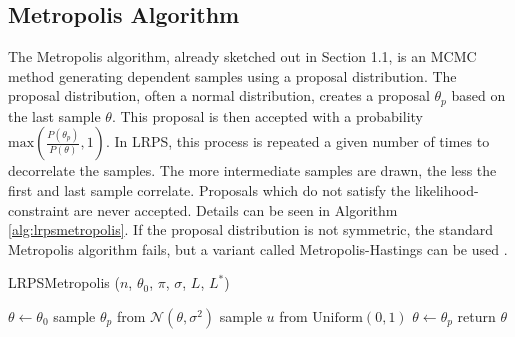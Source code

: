 \documentclass[12pt, a4paper]{report}
\begin{document}
\subsection{Metropolis Algorithm}
The Metropolis algorithm, already sketched out in Section 1.1, is an MCMC method generating dependent samples using a proposal distribution.
The proposal distribution, often a normal distribution, creates a proposal $\theta_p$ based on the last sample $\theta$.
This proposal is then accepted with a probability $\textrm{max}\left(\frac{P(\theta_p)}{P(\theta)}, 1\right)$.
In LRPS, this process is repeated a given number of times to decorrelate the samples.
The more intermediate samples are drawn, the less the first and last sample correlate.
Proposals which do not satisfy the likelihood-constraint are never accepted.
Details can be seen in Algorithm \ref{alg:lrpsmetropolis}.
If the proposal distribution is not symmetric, the standard Metropolis algorithm fails, but a variant called Metropolis-Hastings can be used \cite[p. 365f.]{mckay}.
\begin{algorithm}
    \caption[Likelihood-restricted prior sampling using Metropolis.]{LRPSMetropolis ($n$, $\theta_0$, $\pi$, $\sigma$, $L$, $L^*$)}
    \label{alg:lrpsmetropolis}
    \begin{algorithmic}
        \State $\theta \gets \theta_0$
            \State sample $\theta_p$ from $\mathcal{N}(\theta, \sigma^2)$
            \State sample $u$ from $\textrm{Uniform}(0, 1)$
                \State $\theta \gets \theta_p$
            \EndIf
        \EndFor
        \State return $\theta$
    \end{algorithmic}
\end{algorithm}
\end{document}
